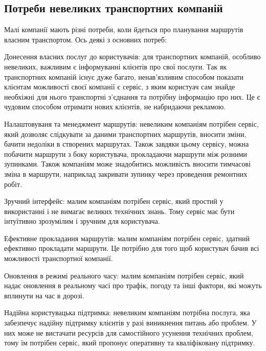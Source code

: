 \subsection{Потреби невеликих транспортних компаній}
\label{subsec:companies-needs-subsection}

Малі компанії мають різні потреби, коли йдеться про планування маршрутів власним транспортом. Ось деякі з основних потреб:

Донесення власних послуг до користувачів: для транспортних компаній, особливо невеликих, важливим є інформуванні клієнтів про свої послуги. Так як транспортних компаній існує дуже багато, ненав'язливим способом показати клієнтам можливості своєї компанії є сервіс, з яким користуач сам знайде необхіжні для нього транспортні з'єднання та потрібну інформацію про них. Це є чудовим способом отримати нових клієнтів, не набридаючи рекламою.

Налаштовуваня та менеджмент маршрутів: невеликим компаніям потрібен сервіс, який дозволяє слідкувати за даними транспортних маршрутів, вносити зміни, бачити недоліки в створених маршрутах. Також завдяки цьому сервісу, можна побачити маршрути з боку користувача, прокладаючи маршрути між розними зупинками. Також компаніям може знадобитись можливість вносити тимчасові зміна в маршрути, наприклад закривати зупинку через проведення ремонтних робіт.

Зручний інтерфейс: малим компаніям потрібен сервіс, який простий у використанні і не вимагає великих технічних знань. Тому сервіс має бути інтуїтивно зрозумілим і зручним для користувача.

Ефективне прокладання маршрутів: малим компаніям потрібен сервіс, здатний ефективно прокладати маршрути. Це потрібно для того щоб користувач бачив всі можливості транспортної компанії.

Оновлення в режимі реального часу: малим компаніям потрібен сервіс, який надає оновлення в реальному часі про трафік, погоду та інші фактори, які можуть вплинути на час в дорозі.

Надійна користувацька підтримка: невеликим компаніям потрібна послуга, яка забезпечує надійну підтримку клієнтів у разі виникнення питань або проблем. У них може не вистачати ресурсів для самостійного усунення технічних проблем, тому їм потрібен сервіс, який пропонує оперативну та кваліфіковану підтримку.
